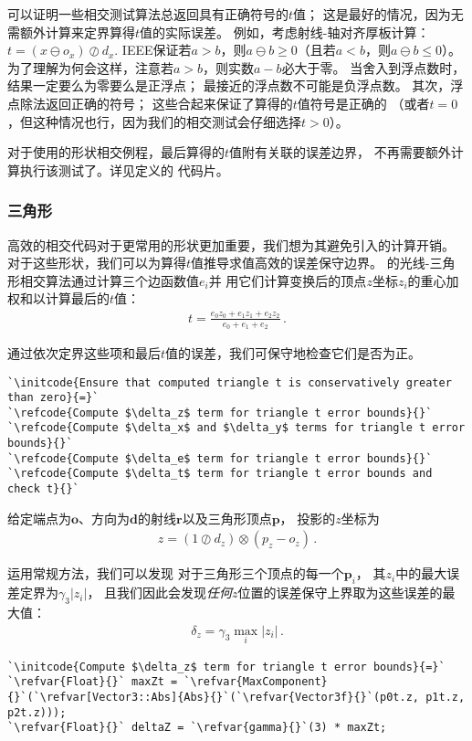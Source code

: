 可以证明一些相交测试算法总返回具有正确符号的$t$值；
这是最好的情况，因为无需额外计算来定界算得$t$值的实际误差。
例如，考虑射线-轴对齐厚板计算：$t=(x\ominus o_x)\oslash d_x$.
IEEE保证若$a>b$，则$a\ominus b\ge0$（且若$a<b$，则$a\ominus b\le0$）。
为了理解为何会这样，注意若$a>b$，则实数$a-b$必大于零。
当舍入到浮点数时，结果一定要么为零要么是正浮点；
最接近的浮点数不可能是负浮点数。
其次，浮点除法返回正确的符号；
这些合起来保证了算得的$t$值符号是正确的
（或者$t=0$，但这种情况也行，因为我们的相交测试会仔细选择$t>0$）。

对于使用的形状相交例程，最后算得的$t$值附有关联的误差边界，
不再需要额外计算执行该测试了。详见定义的
代码片。

\subsubsection*{三角形}

高效的相交代码对于更常用的形状更加重要，我们想为其避免引入的计算开销。
对于这些形状，我们可以为算得$t$值推导求值高效的误差保守边界。
的光线-三角形相交算法通过计算三个边函数值$e_i$并
用它们计算变换后的顶点$z$坐标$z_i$的重心加权和以计算最后的$t$值：
\begin{align}\label{eq:3.18}
    t=\frac{e_0z_0+e_1z_1+e_2z_2}{e_0+e_1+e_2}\, .
\end{align}

通过依次定界这些项和最后$t$值的误差，我们可保守地检查它们是否为正。
\begin{lstlisting}
`\initcode{Ensure that computed triangle t is conservatively greater than zero}{=}`
`\refcode{Compute $\delta_z$ term for triangle t error bounds}{}`
`\refcode{Compute $\delta_x$ and $\delta_y$ terms for triangle t error bounds}{}`
`\refcode{Compute $\delta_e$ term for triangle t error bounds}{}`
`\refcode{Compute $\delta_t$ term for triangle t error bounds and check t}{}`
\end{lstlisting}

给定端点为$\bm o$、方向为$\bm d$的射线$\bm r$以及三角形顶点$\bm p$，
投影的$z$坐标为
\begin{align*}
    z=(1\oslash d_z)\otimes(p_z-o_z)\, .
\end{align*}

运用常规方法，我们可以发现
对于三角形三个顶点的每一个$\bm p_i$，
其$z_i$中的最大误差定界为$\gamma_3|z_i|$，
且我们因此会发现\emph{任何}$z$位置的误差保守上界取为这些误差的最大值：
\begin{align*}
    \delta_z=\gamma_3\max_i{|z_i|}\, .
\end{align*}
\begin{lstlisting}
`\initcode{Compute $\delta_z$ term for triangle t error bounds}{=}`
`\refvar{Float}{}` maxZt = `\refvar{MaxComponent}{}`(`\refvar[Vector3::Abs]{Abs}{}`(`\refvar{Vector3f}{}`(p0t.z, p1t.z, p2t.z)));
`\refvar{Float}{}` deltaZ = `\refvar{gamma}{}`(3) * maxZt;
\end{lstlisting}


